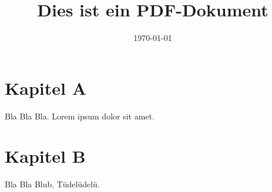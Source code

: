 \documentclass{article}
\title{Dies ist ein PDF-Dokument}
\author{}
\date{\today}
\begin{document}
\maketitle

\section{Kapitel A}
Bla Bla Bla.\newline
Lorem ipsum dolor sit amet.

\section{Kapitel B}
Bla Bla Blub.\newline
Tüdelüdelü.
\end{document}
